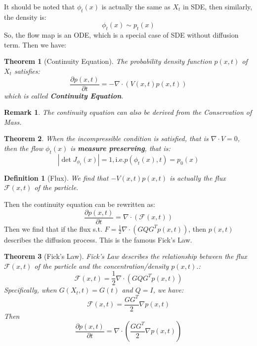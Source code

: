 \documentclass{article}
\newtheorem{theorem}{Theorem}
\newtheorem{remark}{Remark}
\newtheorem{definition}{Definition}
\begin{document}
It should be noted that $\phi_t(x)$ is actually the same as $X_t$ in SDE, then similarly, the density is:
\begin{equation}
    \phi_t(x) \sim p_t(x)
\end{equation}
So, the flow map is an ODE, which is a special case of SDE without diffusion term. Then we have:
\begin{theorem}[Continuity Equation]
    The probability density function $p(x, t)$ of $X_t$ satisfies:
    \begin{equation}
        \frac{\partial p(x, t)}{\partial t} = -\nabla\cdot\left(V(x, t)p(x, t)\right)
    \end{equation}
    which is called \textbf{Continuity Equation}.
\end{theorem}
\begin{remark}
    The continuity equation can also be derived from the Conservation of Mass. 
\end{remark}

\begin{theorem}
    When the incompressible condition is satisfied, that is $\nabla\cdot V=0$, then the flow $\phi_t(x)$ is \textbf{measure preserving}, that is:
    \begin{equation}
        \left|\det J_{\phi_t}(x)\right|=1, \text{i.e.}p(\phi_t(x), t) = p_0(x)
    \end{equation}
\end{theorem}

\begin{definition}[Flux]
    We find that $-V(x, t)p(x, t)$ is actually the flux $\mathcal{F}(x, t)$ of the particle.
\end{definition}
Then the continuity equation can be rewritten as:
\begin{equation}
    \frac{\partial p(x, t)}{\partial t} = \nabla\cdot\left(\mathcal{F}(x, t)\right)
\end{equation}
Then we find that if the flux s.t. $F = \frac{1}{2}\nabla\cdot\left(GQG^Tp(x, t)\right)$, then $p(x, t)$ describes the diffusion process. This is the famous Fick's Law.
\begin{theorem}[Fick's Law]
    Fick's Law describes the relationship between the flux $\mathcal{F}(x, t)$ of the particle and the concentration/density $p(x, t)$.:
    \begin{equation}
        \mathcal{F}(x, t) = \frac{1}{2}\nabla\cdot\left(GQG^Tp(x, t)\right)
    \end{equation}
    Specifically, when $G(X_t, t)=G(t)$ and $Q=I$, we have:
    \begin{equation}
        \mathcal{F}(x, t) = \frac{GG^T}{2}\nabla p(x, t)
    \end{equation}
    Then 
    \begin{equation}
        \frac{\partial p(x, t)}{\partial t} = \nabla \cdot\left(\frac{GG^T}{2}\nabla p(x, t)\right)
    \end{equation}
\end{theorem}
\end{document}
